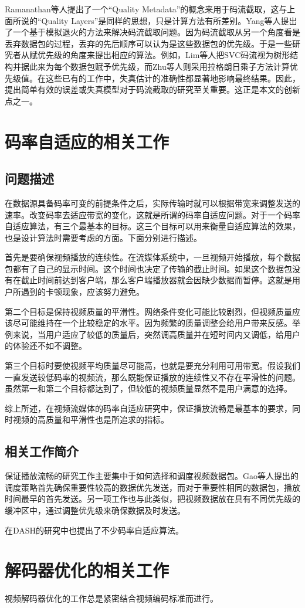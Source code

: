 Ramanathan等人\supercite{Ramanathan2012}提出了一个“Quality Metadata”的概念来用于码流截取，这与上面所说的“Quality Layers”是同样的思想，只是计算方法有所差别。Yang等人\supercite{Yang2013}提出了一个基于模拟退火的方法来解决码流截取问题。因为码流截取从另一个角度看是丢弃数据包的过程，丢弃的先后顺序可以认为是这些数据包的优先级。于是一些研究者从赋优先级的角度来提出相应的算法。例如，Lim等人\supercite{Lim2006}把SVC码流视为树形结构并据此来为每个数据包赋予优先级，而Zhu等人\supercite{Zhu2011}则采用拉格朗日乘子方法计算优先级值。在这些已有的工作中，失真估计的准确性都显著地影响最终结果。因此，提出简单有效的误差或失真模型对于码流截取的研究至关重要。这正是本文的创新点之一。


\section{码率自适应的相关工作}

\subsection{问题描述}

在数据源具备码率可变的前提条件之后，实际传输时就可以根据带宽来调整发送的速率。改变码率去适应带宽的变化，这就是所谓的码率自适应问题。对于一个码率自适应算法，有三个最基本的目标。这三个目标可以用来衡量自适应算法的效果，也是设计算法时需要考虑的方面。下面分别进行描述。

首先是要确保视频播放的连续性。在流媒体系统中，一旦视频开始播放，每个数据包都有了自己的显示时间。这个时间也决定了传输的截止时间。如果这个数据包没有在截止时间前达到客户端，那么客户端播放器就会因缺少数据而暂停。这就是用户所遇到的卡顿现象，应该努力避免。

第二个目标是保持视频质量的平滑性。网络条件变化可能比较剧烈，但视频质量应该尽可能维持在一个比较稳定的水平。因为频繁的质量调整会给用户带来反感。举例来说，当用户适应了较低的质量后，突然调高质量并在短时间内又调低，给用户的体验还不如不调整。

第三个目标时要使视频平均质量尽可能高，也就是要充分利用可用带宽。假设我们一直发送较低码率的视频流，那么既能保证播放的连续性又不存在平滑性的问题。虽然第一和第二个目标都达到了，但较低的视频质量显然不是用户满意的选择。

综上所述，在视频流媒体的码率自适应研究中，保证播放流畅是最基本的要求，同时视频的高质量和平滑性也是所追求的指标。

\subsection{相关工作简介}

保证播放流畅的研究工作主要集中于如何选择和调度视频数据包。Gao等人\supercite{Gao2006}提出的调度策略首先确保重要性较高的数据优先发送，而对于重要性相同的数据包，播放时间最早的首先发送。另一项工作\supercite{Schierl2010}也与此类似，把视频数据放在具有不同优先级的缓冲区中，通过调整优先级来确保数据及时发送。

在DASH的研究中也提出了不少码率自适应算法。

\section{解码器优化的相关工作}

视频解码器优化的工作总是紧密结合视频编码标准而进行。